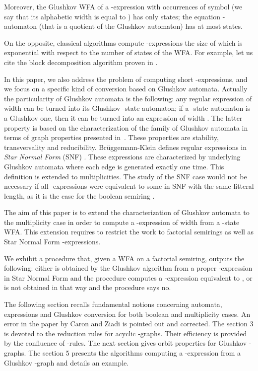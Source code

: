 \documentclass[11pt]{article}
\begin{document}
Moreover, the Glushkov WFA of a -expression with  occurrences of symbol
(we say that its alphabetic width is equal to ) 
has only  states;
the equation -automaton
(that is a quotient of the Glushkov automaton)
has at most  states.

On the opposite, classical algorithms compute -expressions
the size of which is exponential with respect to the number of states of the WFA. For example, let us cite the block decomposition algorithm  proven in \cite{BR88}.




 In this paper, we also address the problem of computing short -expressions,
and we focus on a specific kind of conversion based on Glushkov automata.
Actually the particularity of Glushkov automata is the fol\-lo\-wing:
any regular expression of width  can be turned into its Glushkov -state automaton;
if a -state automaton is a Glushkov one, then it can be turned into an expression of width .
The latter property is based on the characterization of the family of Glushkov automata in terms of graph properties presented in~\cite{CZ97}. These properties are stability, transversality and reducibility.
 Br\"uggemann-Klein defines regular expressions in {\it Star Normal Form} (SNF) \cite{Bru93}. These expressions are characterized by underlying Glushkov  automata where each edge is generated exactly one time. This definition is extended to multiplicities. The study  of the SNF case would not be necessary 
if all -expressions were equivalent to some in SNF with the same litteral length, as it is the case for the boolean semiring .
 
 The aim of this paper is to extend the characterization of Glushkov automata to the multiplicity case in order to compute a -expression of width  from a -state WFA. This extension requires to restrict the work to factorial semirings as well as Star Normal Form -expressions. 
 
We exhibit a procedure that, given a WFA  on  a factorial semiring, outputs the following: 
either  is obtained by the Glushkov algorithm from a proper -expression  in Star Normal Form and the 
procedure computes a -expression  equivalent to , or  is not obtained in that way and the procedure 
says no.

The following section recalls fundamental notions concerning automata, expressions and Glushkov conversion for both boolean and multiplicity cases. An error in the paper by Caron and Ziadi \cite{CZ97} is pointed out and corrected. The section 3 is devoted to the reduction rules for acyclic -graphs. Their efficiency is provided by the confluence of -rules. The next section gives orbit properties for Glushkov -graphs. The section 5 presents the algorithms computing a -expression from a Glushkov -graph and details an example. 
\end{document}
